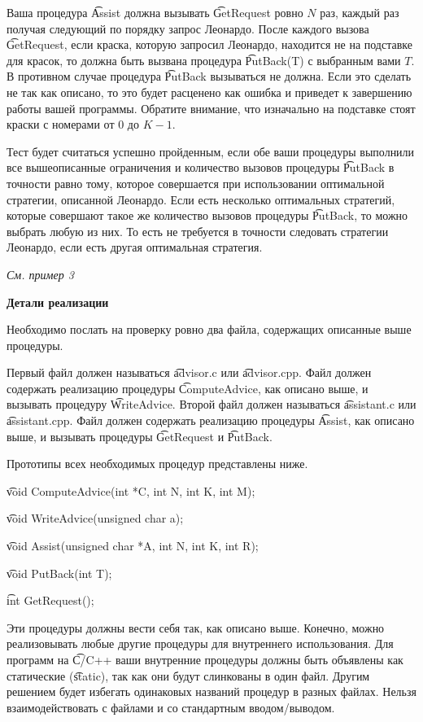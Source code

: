 Ваша процедура \t{Assist} должна вызывать \t{GetRequest} ровно $N$ раз, каждый раз получая следующий по порядку запрос Леонардо. После каждого вызова \t{GetRequest}, если краска, которую запросил Леонардо, находится не на подставке для красок, то должна быть вызвана процедура \t{PutBack(T)} с выбранным вами $T$. В противном случае процедура \t{PutBack} вызываться не должна. Если это сделать не так как описано, то это будет расценено как ошибка и приведет к завершению работы вашей программы. Обратите внимание, что изначально на подставке стоят краски с номерами от $0$ до $K-1$.

Тест будет считаться успешно пройденным, если обе ваши процедуры выполнили все вышеописанные ограничения и количество вызовов процедуры \t{PutBack} в точности равно тому, которое совершается при использовании оптимальной стратегии, описанной Леонардо. Если есть несколько оптимальных стратегий, которые совершают такое же количество вызовов процедуры \t{PutBack}, то можно выбрать любую из них. То есть не требуется в точности следовать стратегии Леонардо, если есть другая оптимальная стратегия.

\textit{См. пример 3}

\bf{Детали реализации }

Необходимо послать на проверку ровно два файла, содержащих описанные выше процедуры. 

Первый файл должен называться \t{advisor.c} или \t{advisor.cpp}. Файл должен содержать реализацию процедуры \t{ComputeAdvice}, как описано выше, и вызывать процедуру \t{WriteAdvice}. Второй файл должен называться \t{assistant.c} или \t{assistant.cpp}. Файл должен содержать реализацию процедуры \t{Assist}, как описано выше, и вызывать процедуры \t{GetRequest} и \t{PutBack}. 

Прототипы всех необходимых процедур представлены ниже. 

\t{void ComputeAdvice(int *C, int N, int K, int M);}

\t{void WriteAdvice(unsigned char a);}

\t{void Assist(unsigned char *A, int N, int K, int R);}

\t{void PutBack(int T);}

\t{int GetRequest();}

Эти процедуры должны вести себя так, как описано выше. Конечно, можно реализовывать любые другие процедуры для внутреннего использования. Для программ на \t{C/C++} ваши внутренние процедуры должны быть объявлены как статические (\t{static}), так как они будут слинкованы в один файл. Другим решением будет избегать одинаковых названий процедур в разных файлах. Нельзя взаимодействовать с файлами и со стандартным вводом/выводом. 

